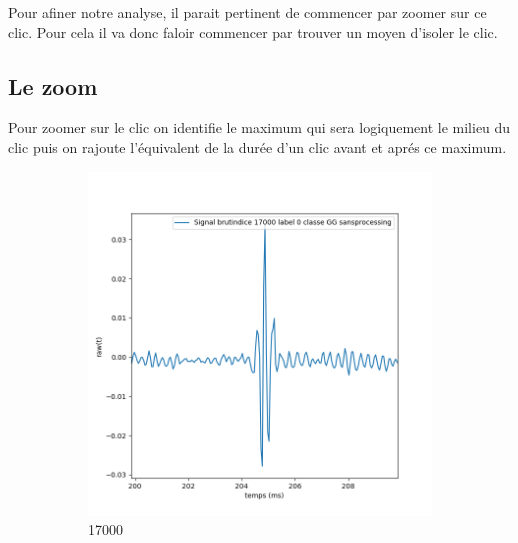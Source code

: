 Pour afiner notre analyse, il parait pertinent de commencer par zoomer sur ce clic.
Pour cela il va donc faloir commencer par trouver un moyen d'isoler le clic.

\hypertarget{Le-zoom}{%
\subsection{Le zoom}
\label{Le-zoom}}

Pour zoomer sur le clic on identifie le maximum qui sera logiquement le milieu du clic puis on rajoute l'équivalent de la durée d'un clic avant et aprés ce maximum.

\begin{figure}[!h]
  \centering
  \begin{subfigure}[b]{0.3\textwidth}
    \includegraphics[width=\textwidth]{./images/indice17000Spectro1Dlabel0classeGGsansprocessingaveczoom.png}
    \caption{17000}
  \end{subfigure}
  \begin{subfigure}[b]{0.3\textwidth}

\end{subfigure}
\end{figure}
